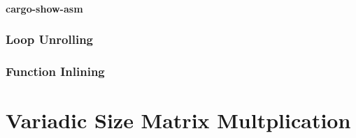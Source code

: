 \paragraph{cargo-show-asm}
\subsubsection{Loop Unrolling}
\subsubsection{Function Inlining}
\section{Variadic Size Matrix Multplication}
